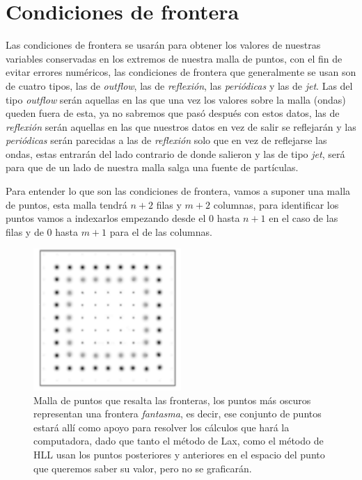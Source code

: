 \documentclass[12pt,a4paper]{book}
\begin{document}
\chapter{Condiciones de frontera} \label{aped.B}
Las condiciones de frontera se usarán para obtener los valores de nuestras variables conservadas en los extremos de nuestra malla de puntos, con el fin de evitar errores numéricos, las condiciones de frontera que 
generalmente se usan son de cuatro tipos, las de \textit{outflow}, las de \textit{reflexión}, las \textit{periódicas} y las de \textit{jet}. Las del tipo \textit{outflow} serán aquellas en las que una vez los valores 
sobre la malla (ondas) queden fuera de esta, ya no sabremos que pasó después con estos datos, las de \textit{reflexión} serán aquellas en las que nuestros datos en vez de salir se reflejarán y las \textit{periódicas} 
serán parecidas a las de \textit{reflexión} solo que en vez de reflejarse las ondas, estas entrarán del lado contrario de donde salieron  y las de tipo \textit{jet}, será para que de un lado de nuestra malla salga una 
fuente de partículas.

Para entender lo que son las condiciones de frontera, vamos a suponer una malla de puntos, esta malla tendrá $n+2$ filas y $m+2$ columnas, para identificar los puntos vamos a indexarlos empezando desde el 0 hasta 
$n+1$ en el caso de las filas y de 0 hasta $m+1$ para el de las columnas.

\begin{figure}[H]
\centering
\includegraphics[width=0.5\textwidth]{./Figuras/Apendice/malla.png}
\caption{Malla de puntos que resalta las fronteras, los puntos más oscuros representan una frontera \emph{fantasma}, es decir, ese conjunto de puntos estará allí como apoyo para resolver los cálculos que hará 
la computadora, dado que tanto el método de Lax, como el método de HLL usan los puntos posteriores y anteriores en el espacio del punto que queremos saber su valor, pero no se graficarán.} \label{fig: malla de puntos}
\end{figure}
\end{document}
